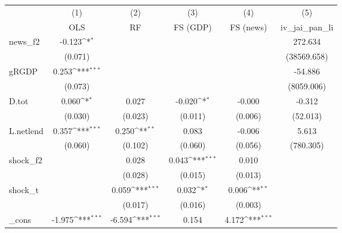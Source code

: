 {
\def\sym#1{\ifmmode^{#1}\else\(^{#1}\)\fi}
\begin{tabular}{l*{5}{c}}
\toprule
            &\multicolumn{1}{c}{(1)}&\multicolumn{1}{c}{(2)}&\multicolumn{1}{c}{(3)}&\multicolumn{1}{c}{(4)}&\multicolumn{1}{c}{(5)}\\
            &\multicolumn{1}{c}{OLS}&\multicolumn{1}{c}{RF}&\multicolumn{1}{c}{FS (GDP)}&\multicolumn{1}{c}{FS (news)}&\multicolumn{1}{c}{iv\_jai\_pan\_li}\\
\midrule
news\_f2     &      -0.123\sym{*}  &                     &                     &                     &     272.634         \\
            &     (0.071)         &                     &                     &                     & (38569.658)         \\
\addlinespace
gRGDP       &       0.253\sym{***}&                     &                     &                     &     -54.886         \\
            &     (0.073)         &                     &                     &                     &  (8059.006)         \\
\addlinespace
D.tot       &       0.060\sym{*}  &       0.027         &      -0.020\sym{*}  &      -0.000         &      -0.312         \\
            &     (0.030)         &     (0.023)         &     (0.011)         &     (0.006)         &    (52.013)         \\
\addlinespace
L.netlend   &       0.357\sym{***}&       0.250\sym{**} &       0.083         &      -0.006         &       5.613         \\
            &     (0.060)         &     (0.102)         &     (0.060)         &     (0.056)         &   (780.305)         \\
\addlinespace
shock\_f2    &                     &       0.028         &       0.043\sym{***}&       0.010         &                     \\
            &                     &     (0.028)         &     (0.015)         &     (0.013)         &                     \\
\addlinespace
shock\_t     &                     &       0.059\sym{***}&       0.032\sym{*}  &       0.006\sym{**} &                     \\
            &                     &     (0.017)         &     (0.016)         &     (0.003)         &                     \\
\addlinespace
\_cons      &      -1.975\sym{***}&      -6.594\sym{***}&       0.154         &       4.172\sym{***}&                     \\

\end{tabular}}
